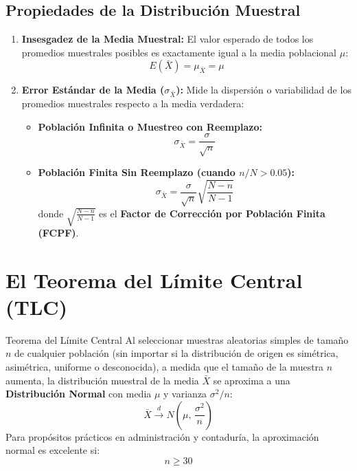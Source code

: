 \subsection{Propiedades de la Distribución Muestral}
\begin{enumerate}
    \item \textbf{Insesgadez de la Media Muestral:}
    El valor esperado de todos los promedios muestrales posibles es exactamente igual a la media poblacional $\mu$:
    \begin{equation}
        E(\bar{X}) = \mu_{\bar{X}} = \mu
    \end{equation}
    
    \item \textbf{Error Estándar de la Media ($\sigma_{\bar{X}}$):}
    Mide la dispersión o variabilidad de los promedios muestrales respecto a la media verdadera:
    \begin{itemize}
        \item \textbf{Población Infinita o Muestreo con Reemplazo:}
        \begin{equation}
            \sigma_{\bar{X}} = \frac{\sigma}{\sqrt{n}}
        \end{equation}
        \item \textbf{Población Finita Sin Reemplazo (cuando $n/N > 0.05$):}
        \begin{equation}
            \sigma_{\bar{X}} = \frac{\sigma}{\sqrt{n}} \sqrt{\frac{N - n}{N - 1}}
        \end{equation}
        donde $\sqrt{\frac{N-n}{N-1}}$ es el \textbf{Factor de Corrección por Población Finita (FCPF)}.
    \end{itemize}
\end{enumerate}

\section{El Teorema del Límite Central (TLC)}
\begin{definicion}{Teorema del Límite Central}
Al seleccionar muestras aleatorias simples de tamaño $n$ de cualquier población (sin importar si la distribución de origen es simétrica, asimétrica, uniforme o desconocida), a medida que el tamaño de la muestra $n$ aumenta, la distribución muestral de la media $\bar{X}$ se aproxima a una \textbf{Distribución Normal} con media $\mu$ y varianza $\sigma^2 / n$:
\begin{equation}
    \bar{X} \xrightarrow{d} N\left( \mu, \, \frac{\sigma^2}{n} \right)
\end{equation}
Para propósitos prácticos en administración y contaduría, la aproximación normal es excelente si:
\begin{equation}
    n \ge 30
\end{equation}
\end{definicion}

